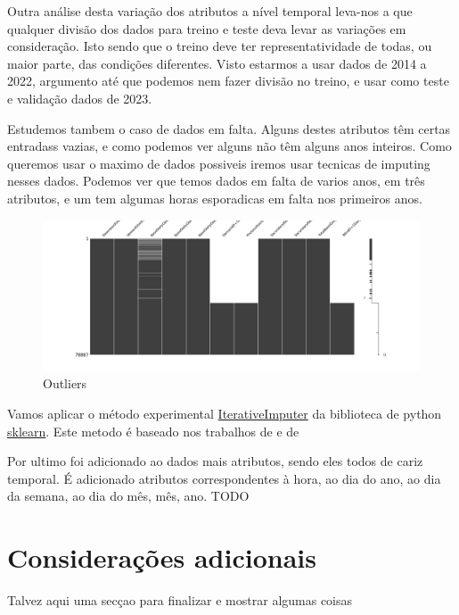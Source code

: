 Outra análise desta variação dos atributos a nível temporal leva-nos a que qualquer divisão dos dados para treino e teste deva levar as variações em consideração. Isto sendo que o treino deve ter representatividade de todas, ou maior parte, das condições diferentes.
Visto estarmos a usar dados de 2014 a 2022, argumento até que podemos nem fazer divisão no treino, e usar como teste e validação dados de 2023.


Estudemos tambem o caso de dados em falta. Alguns destes atributos têm certas entradass vazias, e como podemos ver alguns não têm alguns anos inteiros.
Como queremos usar o maximo de dados possiveis iremos usar tecnicas de imputing nesses dados.
Podemos ver que temos dados em falta de varios anos, em três atributos, e um tem algumas horas esporadicas em falta nos primeiros anos.

\begin{figure}[H]
  \centering
  \includegraphics[width=\textwidth]{../plots/missing_data.png}
  \caption{Outliers}
\end{figure}

Vamos aplicar o método experimental \href{https://scikit-learn.org/stable/modules/generated/sklearn.impute.IterativeImputer.html}{IterativeImputer} da biblioteca de python \href{https://scikit-learn.org/stable/index.html}{sklearn}.
Este metodo é baseado nos trabalhos de \cite{vanBuuren2011} e de \cite{Buck1960}


Por ultimo foi adicionado ao dados mais atributos, sendo eles todos de cariz temporal. É adicionado atributos correspondentes à hora, ao dia do ano, ao dia da semana, ao dia do mês, mês, ano. TODO


\section{Considerações adicionais  \label{se:dados_plus}}

Talvez aqui uma secçao para finalizar e mostrar algumas coisas
